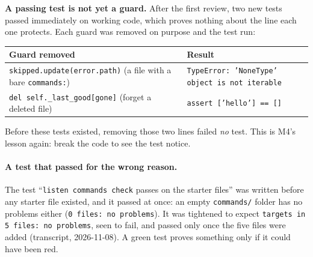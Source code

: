 \documentclass[11pt,a4paper]{article}
\begin{document}
\begin{caution}
\textbf{A passing test is not yet a guard.} After the first review, two new tests passed
immediately on working code, which proves nothing about the line each one protects. Each guard was
removed on purpose and the test run:
\begin{center}
\begin{tabularx}{\textwidth}{p{} X}
\toprule
\textbf{Guard removed} & \textbf{Result} \\
\midrule
\texttt{skipped.update(error.path)} (a file with a bare \texttt{commands:}) &
  \texttt{TypeError: 'NoneType' object is not iterable} \\
\texttt{del self.\_last\_good[gone]} (forget a deleted file) &
  \texttt{assert ['hello'] == []} \\
\bottomrule
\end{tabularx}
\end{center}
Before these tests existed, removing those two lines failed \emph{no} test. This is M4's lesson
again: break the code to see the test notice.
\end{caution}

\paragraph{A test that passed for the wrong reason.} The test ``\texttt{listen commands check}
passes on the starter files'' was written before any starter file existed, and it passed at once:
an empty \texttt{commands/} folder has no problems either (\texttt{0 files: no problems}). It was
tightened to expect \texttt{targets in 5 files: no problems}, seen to fail, and passed only once
the five files were added (transcript, 2026-11-08). A green test proves something only if it could
have been red.
\end{document}
